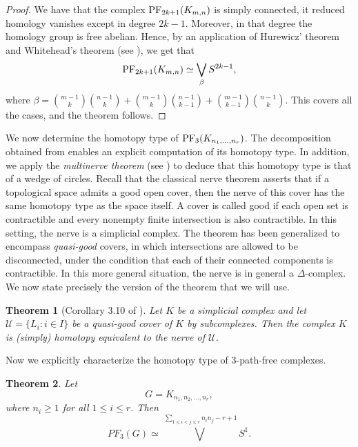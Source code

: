 \documentclass[12pt,reqno]{amsart}
\newtheorem{theorem}[theorem]{Theorem}
\theoremstyle{definition}
\newcommand{\PF}{{\rm PF}}
\begin{document}
\begin{proof}
We have that the complex $\PF_{2k+1}(K_{m,n})$ is simply connected, it reduced homology vanishes except in degree $2k-1$. 
Moreover, in that degree the homology group is free abelian. 
Hence, by an application of Hurewicz' theorem and Whitehead's theorem (see \cite[Section 6.7]{kozlov2007}), we get that 
\[\PF_{2k+1}(K_{m,n}) \simeq \bigvee_{\beta} S^{2k-1},\]
where $\beta = \binom{m-1}{k}\binom{n-1}{k} + \binom{m-1}{k}\binom{n-1}{k-1} + \binom{m-1}{k-1}\binom{n-1}{k}$. 
This covers all the cases, and the theorem follows. 
\end{proof}

We now determine the homotopy type of $\PF_3(K_{n_1,\ldots,n_r})$.
The decomposition obtained from  enables an explicit computation of its homotopy type. 
In addition, we apply the \emph{multinerve theorem} (see \cite{multinerve01, ramras}) to deduce that this homotopy type is that of a wedge of circles.
Recall that the classical nerve theorem asserts that if a topological space admits a good open cover, then the nerve of this cover has the same homotopy type as the space itself. 
A cover is called good if each open set is contractible and every nonempty finite intersection is also contractible. 
In this setting, the nerve is a simplicial complex. 
The theorem has been generalized to encompass \emph{quasi-good} covers, in which intersections are allowed to be disconnected, under the condition that each of their connected components is contractible. 
In this more general situation, the nerve is in general a $\Delta$-complex. 
We now state precisely the version of the theorem that we will use.

\begin{theorem}[Corollary 3.10 of \cite{multinerve02}]
    Let $K$ be a simplicial complex and let $\mathcal{U} = \{L_i: i\in I\}$ be a quasi-good cover of $K$ by subcomplexes. Then the complex $K$ is (simply) homotopy equivalent to the nerve of $\mathcal{U}$. 
\end{theorem}

Now we explicitly characterize the homotopy type of $3$-path-free complexes. 


\begin{theorem}
Let
\[
G=K_{n_1,n_2,\ldots,n_r},
\]
where $n_i\ge 1$ for all $1\le i\le r$. Then
\[
PF_3(G)
\simeq
\bigvee^{\,\sum_{1\le i<j\le r}n_in_j-r+1}S^1.
\]
\end{theorem}
\end{document}
